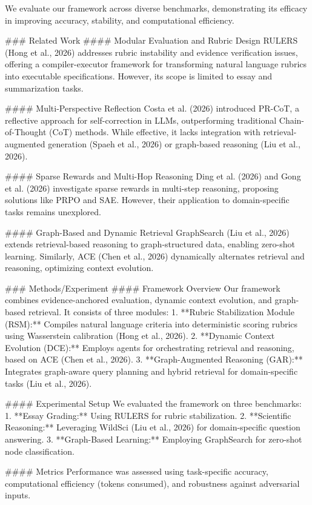 We evaluate our framework across diverse benchmarks, demonstrating its efficacy in improving accuracy, stability, and computational efficiency.  

### Related Work  
#### Modular Evaluation and Rubric Design  
RULERS (Hong et al., 2026) addresses rubric instability and evidence verification issues, offering a compiler-executor framework for transforming natural language rubrics into executable specifications. However, its scope is limited to essay and summarization tasks.  

#### Multi-Perspective Reflection  
Costa et al. (2026) introduced PR-CoT, a reflective approach for self-correction in LLMs, outperforming traditional Chain-of-Thought (CoT) methods. While effective, it lacks integration with retrieval-augmented generation (Spaeh et al., 2026) or graph-based reasoning (Liu et al., 2026).  

#### Sparse Rewards and Multi-Hop Reasoning  
Ding et al. (2026) and Gong et al. (2026) investigate sparse rewards in multi-step reasoning, proposing solutions like PRPO and SAE. However, their application to domain-specific tasks remains unexplored.  

#### Graph-Based and Dynamic Retrieval  
GraphSearch (Liu et al., 2026) extends retrieval-based reasoning to graph-structured data, enabling zero-shot learning. Similarly, ACE (Chen et al., 2026) dynamically alternates retrieval and reasoning, optimizing context evolution.  

### Methods/Experiment  
#### Framework Overview  
Our framework combines evidence-anchored evaluation, dynamic context evolution, and graph-based retrieval. It consists of three modules:  
1. **Rubric Stabilization Module (RSM):** Compiles natural language criteria into deterministic scoring rubrics using Wasserstein calibration (Hong et al., 2026).  
2. **Dynamic Context Evolution (DCE):** Employs agents for orchestrating retrieval and reasoning, based on ACE (Chen et al., 2026).  
3. **Graph-Augmented Reasoning (GAR):** Integrates graph-aware query planning and hybrid retrieval for domain-specific tasks (Liu et al., 2026).  

#### Experimental Setup  
We evaluated the framework on three benchmarks:  
1. **Essay Grading:** Using RULERS for rubric stabilization.  
2. **Scientific Reasoning:** Leveraging WildSci (Liu et al., 2026) for domain-specific question answering.  
3. **Graph-Based Learning:** Employing GraphSearch for zero-shot node classification.  

#### Metrics  
Performance was assessed using task-specific accuracy, computational efficiency (tokens consumed), and robustness against adversarial inputs.  

